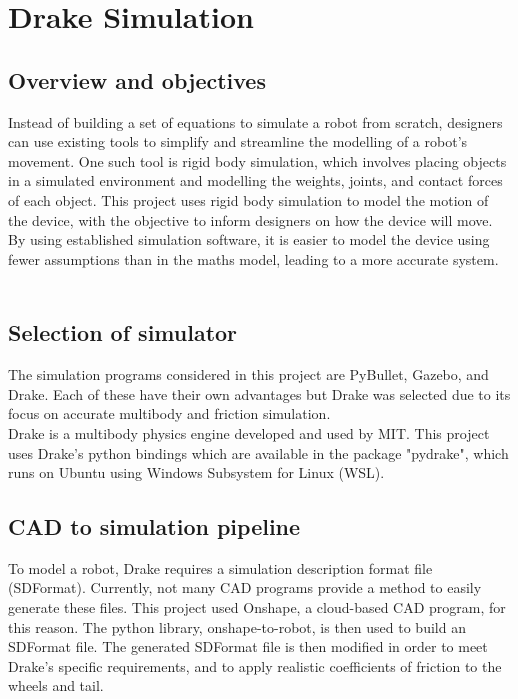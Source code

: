 \chapter{Drake Simulation}

\section{Overview and objectives}

Instead of building a set of equations to simulate a robot from scratch, designers can use existing tools to simplify and streamline the modelling of a robot's movement. One such tool is rigid body simulation, which involves placing objects in a simulated environment and modelling the weights, joints, and contact forces of each object. This project uses rigid body simulation to model the motion of the device, with the objective to inform designers on how the device will move. By using established simulation software, it is easier to model the device using fewer assumptions than in the maths model, leading to a more accurate system.\\
\\
\section{Selection of simulator}
The simulation programs considered in this project are PyBullet, Gazebo, and Drake. Each of these have their own advantages but Drake was selected due to its focus on accurate multibody and friction simulation.
\\
Drake is a multibody physics engine developed and used by MIT. This project uses Drake's python bindings which are available in the package "pydrake", which runs on Ubuntu using Windows Subsystem for Linux (WSL).\\
\section{CAD to simulation pipeline}
To model a robot, Drake requires a simulation description format file (SDFormat). Currently, not many CAD programs provide a method to easily generate these files. This project used Onshape, a cloud-based CAD program, for this reason. The python library, onshape-to-robot, is then used to build an SDFormat file. The generated SDFormat file is then modified in order to meet Drake's specific requirements, and to apply realistic coefficients of friction to the wheels and tail.\\

